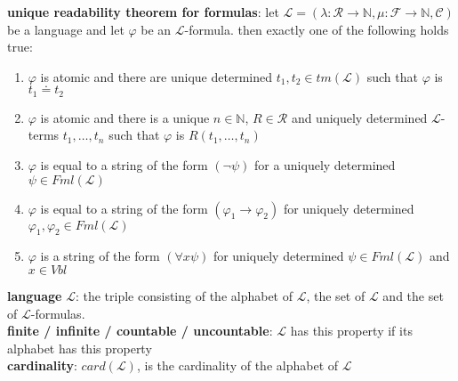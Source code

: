 \documentclass[a4paper]{article}
\begin{document}
\begin{framed}
	\noindent
	\textbf{unique readability theorem for formulas}: let $\mathscr{L} = (\lambda : \mathscr{R} \rightarrow \mathbb{N}, \mu : \mathscr{F} \rightarrow \mathbb{N}, \mathscr{C})$ be a language and let $\varphi$ be an $\mathscr{L}$-formula. then exactly one of the following holds true:
	\begin{enumerate}[label=(\roman*), itemsep=-3pt, topsep=0pt]
		\item $\varphi$ is atomic and there are unique determined $t_1, t_2 \in tm(\mathscr{L})$ such that $\varphi$ is $t_1 \doteq t_2$
		\item $\varphi$ is atomic and there is a unique $n \in \mathbb{N}$, $R \in \mathscr{R}$ and uniquely determined $\mathscr{L}$-terms $t_1, \dots, t_n$ such that $\varphi$ is $R(t_1, \dots, t_n)$
		\item $\varphi$ is equal to a string of the form $(\neg \psi)$ for a uniquely determined $\psi \in Fml(\mathscr{L})$
		\item $\varphi$ is equal to a string of the form $(\varphi_1 \rightarrow \varphi_2)$ for uniquely determined $\varphi_1, \varphi_2 \in Fml(\mathscr{L})$
		\item $\varphi$ is a string of the form $(\forall x \psi)$ for uniquely determined $\psi \in Fml(\mathscr{L})$ and $x \in Vbl$\\
	\end{enumerate}
	
	\noindent
	\textbf{language} $\mathscr{L}$: the triple consisting of the alphabet of $\mathscr{L}$, the set of $\mathscr{L}$ and the set of $\mathscr{L}$-formulas.\\
	\textbf{finite / infinite / countable / uncountable}: $\mathscr{L}$ has this property if its alphabet has this property\\
	\textbf{cardinality}: $card(\mathscr{L})$, is the cardinality of the alphabet of $\mathscr{L}$
\end{framed}
\end{document}
